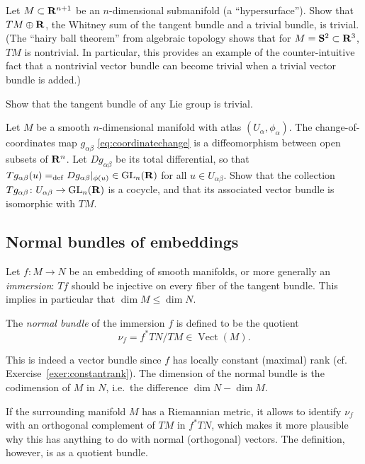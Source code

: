 \documentclass[a4paper,openany]{scrbook}
\DeclareMathOperator{\Vect}{Vect}
\begin{document}
\begin{exer}
Let $M \subset \mathbf R^{n+1}$ be an $n$-dimensional submanifold (a ``hypersurface''). Show that $TM \oplus \mathbf R$, the Whitney sum of the tangent bundle and a trivial bundle, is trivial. (The ``hairy ball theorem'' from algebraic topology \cite{hatcher:AT} shows that for $M=\mathbf S^2 \subset \mathbf R^3$, $TM$ is nontrivial. In particular, this provides an example of the counter-intuitive fact that a nontrivial vector bundle can become trivial when a trivial vector bundle is added.)
\end{exer}

\begin{exer}
Show that the tangent bundle of any Lie group is trivial.
\end{exer}

\begin{exer}
Let $M$ be a smooth $n$-dimensional manifold with atlas $(U_\alpha,\phi_\alpha)$. The change-of-coordinates map $g_{\alpha\beta}$ \eqref{eq:coordinatechange} is a diffeomorphism between open subsets of $\mathbf R^n$. Let $Dg_{\alpha\beta}$ be its total differential, so that $Tg_{\alpha\beta}(u) =_{\operatorname{def}} Dg_{\alpha\beta}|_{\phi(u)} \in \operatorname{GL}_n(\mathbf R)$ for all $u \in U_{\alpha\beta}$. Show that the collection $Tg_{\alpha\beta}\colon U_{\alpha\beta} \to \operatorname{GL}_n(\mathbf R)$ is a cocycle, and that its associated vector bundle is isomorphic with $TM$.
\end{exer}

\subsection{Normal bundles of embeddings}

Let $f\colon M \to N$ be an embedding of smooth manifolds, or more generally an \emph{immersion}: $Tf$ should be injective on every fiber of the tangent bundle. This implies in particular that $\dim M \leq \dim N$.

\begin{defn}
The \emph{normal bundle} of the immersion $f$ is defined to be the quotient
\[
\nu_{f} = f^*TN/TM \in \Vect(M).
\]
\end{defn}

This is indeed a vector bundle since $f$ has locally constant (maximal) rank (cf. Exercise~\ref{exer:constantrank}). The dimension of the normal bundle is the codimension of $M$ in $N$, i.e.\ the difference $\dim N-\dim M$. 

If the surrounding manifold $M$ has a Riemannian metric, it allows to identify $\nu_f$ with an orthogonal complement of $TM$ in $f^*TN$, which makes it more plausible why this has anything to do with normal (orthogonal) vectors. The definition, however, is as a quotient bundle.
\end{document}
